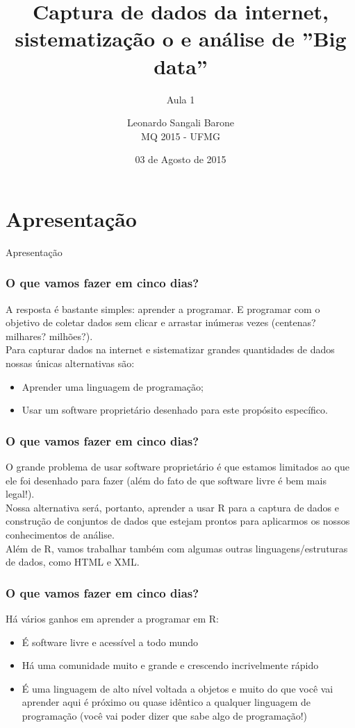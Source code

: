 \documentclass[11pt]{beamer}
\title{Captura de dados da internet, sistematização o e análise de ”Big data”}
\subtitle{Aula 1}
\author[Leonardo Sangali Barone]{Leonardo Sangali Barone\\MQ 2015 - UFMG}
\date[03 de Agosto de 2015]{03 de Agosto de 2015}
\begin{document}
\frame{\titlepage}

\section{Apresentação}
\begin{frame}
	\LARGE{Apresentação}
\end{frame}

\begin{frame}
	\frametitle{O que vamos fazer em cinco dias?}
	A resposta é bastante simples: aprender a programar. E programar com o objetivo de coletar dados sem clicar e arrastar inúmeras vezes (centenas? milhares? milhões?).
	\newline\\
	Para capturar dados na internet e sistematizar grandes quantidades de dados nossas únicas alternativas são:
	\begin{itemize}
		\item Aprender uma linguagem de programação;
		\item Usar um software proprietário desenhado para este propósito específico.
	\end{itemize}
\end{frame}

\begin{frame}
	\frametitle{O que vamos fazer em cinco dias?}
	O grande problema de usar software proprietário é que estamos limitados ao que ele foi desenhado para fazer (além do fato de que software livre é bem mais legal!).
	\newline\\
	Nossa alternativa será, portanto, aprender a usar R para a captura de dados e construção de conjuntos de dados que estejam prontos para aplicarmos os nossos conhecimentos de análise.
	\newline\\
	Além de R, vamos trabalhar também com algumas outras linguagens/estruturas de dados, como HTML e XML.
\end{frame}

\begin{frame}
	\frametitle{O que vamos fazer em cinco dias?}
	Há vários ganhos em aprender a programar em R:
	\begin{itemize}
		\item É software livre e acessível a todo mundo
		\item Há uma comunidade muito e grande e crescendo incrivelmente rápido
		\item É uma linguagem de alto nível voltada a objetos e muito do que você vai aprender aqui é próximo ou quase idêntico a qualquer linguagem de programação (você vai poder dizer que sabe algo de programação!)
	\end{itemize}
\end{frame}
\end{document}
